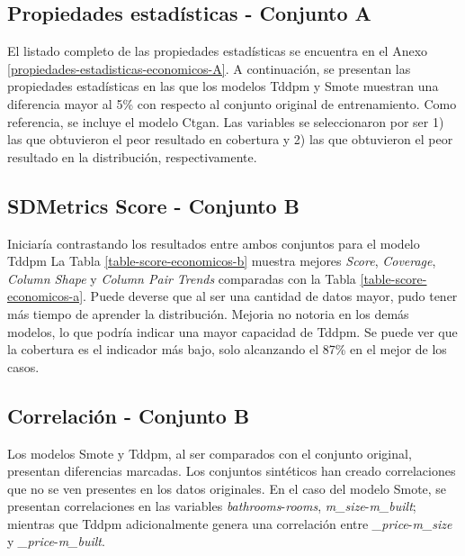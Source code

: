 \newpage
\subsection{Propiedades estadísticas - Conjunto A}
El listado completo de las propiedades estadísticas se encuentra en el Anexo \ref{propiedades-estadisticas-economicos-A}. A continuación, se presentan las propiedades estadísticas en las que los modelos Tddpm y Smote muestran una diferencia mayor al 5\% con respecto al conjunto original de entrenamiento. Como referencia, se incluye el modelo Ctgan. Las variables se seleccionaron por ser 1) las que obtuvieron el peor resultado en cobertura y 2) las que obtuvieron el peor resultado en la distribución, respectivamente.




\newpage
\subsection{SDMetrics Score - Conjunto B}
\label{ds-conjunto-b}
Iniciaría contrastando los resultados entre ambos conjuntos para el modelo Tddpm La Tabla \ref{table-score-economicos-b} muestra mejores \emph{Score}, \emph{Coverage}, \emph{Column Shape} y \emph{Column Pair Trends} comparadas con la Tabla \ref{table-score-economicos-a}. Puede deverse que al ser una cantidad de datos mayor, pudo tener más tiempo de aprender la distribución. Mejoria no notoria en los demás modelos, lo que podría indicar una mayor capacidad de Tddpm. Se puede ver que la cobertura es el indicador más bajo, solo alcanzando el 87\% en el mejor de los casos.



\newpage
\subsection{Correlación - Conjunto B}
Los modelos Smote y Tddpm, al ser comparados con el conjunto original, presentan diferencias marcadas. Los conjuntos sintéticos han creado correlaciones que no se ven presentes en los datos originales. En el caso del modelo Smote, se presentan correlaciones en las variables \emph{bathrooms}-\emph{rooms}, \emph{m\_size}-\emph{m\_built}; mientras que Tddpm adicionalmente genera una correlación entre \emph{\_price}-\emph{m\_size} y \emph{\_price}-\emph{m\_built}.


